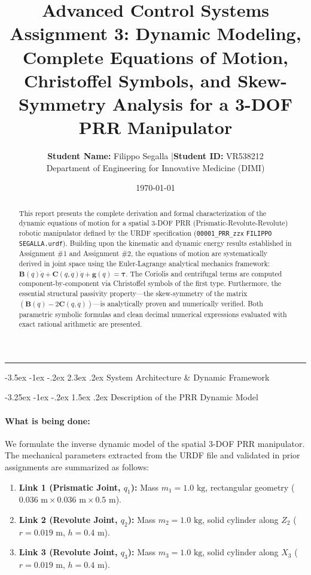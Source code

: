 ﻿\documentclass[11pt, a4paper]{article}
\title{
    \vspace{-1cm}
    \color{brandblue}\textbf{Advanced Control Systems}\\[0.3em]
    \Large\textbf{Assignment 3: Dynamic Modeling, Complete Equations of Motion, Christoffel Symbols, and Skew-Symmetry Analysis for a 3-DOF PRR Manipulator}
}
\author{\textbf{Student Name:} Filippo Segalla \quad|\quad \textbf{Student ID:} VR538212\\[0.2em]
\small Department of Engineering for Innovative Medicine (DIMI) }
\date{\today}
\makeatletter
\renewcommand{\section}{\@startsection{section}{1}{\z@}%
    {-3.5ex \@plus -1ex \@minus -.2ex}%
    {2.3ex \@plus .2ex}%
    {\normalfont\Large\bfseries\color{brandblue}}}
\renewcommand{\subsection}{\@startsection{subsection}{2}{\z@}%
    {-3.25ex \@plus -1ex \@minus -.2ex}%
    {1.5ex \@plus .2ex}%
    {\normalfont\large\bfseries\color{brandaccent}}}
\makeatother
\begin{document}
\maketitle
\thispagestyle{empty}

\begin{abstract}
\noindent 
This report presents the complete derivation and formal characterization of the dynamic equations of motion for a spatial 3-DOF PRR (Prismatic-Revolute-Revolute) robotic manipulator defined by the URDF specification (\texttt{00001\_PRR\_zzx} \texttt{FILIPPO} \texttt{SEGALLA.urdf}). Building upon the kinematic and dynamic energy results established in Assignment \#1 and Assignment \#2, the equations of motion are systematically derived in joint space using the Euler-Lagrange analytical mechanics framework: $\mathbf{B}(q)\ddot{q} + \mathbf{C}(q, \dot{q})\dot{q} + \mathbf{g}(q) = \boldsymbol{\tau}$. The Coriolis and centrifugal terms are computed component-by-component via Christoffel symbols of the first type. Furthermore, the essential structural passivity property—the skew-symmetry of the matrix $(\mathbf{\dot{B}}(q) - 2\mathbf{C}(q, \dot{q}))$—is analytically proven and numerically verified. Both parametric symbolic formulas and clean decimal numerical expressions evaluated with exact rational arithmetic are presented.
\end{abstract}

\hrule
\vspace{1.5em}

\section{System Architecture \& Dynamic Framework}

\subsection{Description of the PRR Dynamic Model}
\paragraph{What is being done:}
We formulate the inverse dynamic model of the spatial 3-DOF PRR manipulator. The mechanical parameters extracted from the URDF file and validated in prior assignments are summarized as follows:
\begin{enumerate}[leftmargin=1.5em]
    \item \textbf{Link 1 (Prismatic Joint, $q_1$):} Mass $m_1 = 1.0\text{ kg}$, rectangular geometry ($0.036\text{ m} \times 0.036\text{ m} \times 0.5\text{ m}$).
    \item \textbf{Link 2 (Revolute Joint, $q_2$):} Mass $m_2 = 1.0\text{ kg}$, solid cylinder along $Z_2$ ($r = 0.019\text{ m}$, $h = 0.4\text{ m}$).
    \item \textbf{Link 3 (Revolute Joint, $q_3$):} Mass $m_3 = 1.0\text{ kg}$, solid cylinder along $X_3$ ($r = 0.019\text{ m}$, $h = 0.4\text{ m}$).
\end{enumerate}
\end{document}
